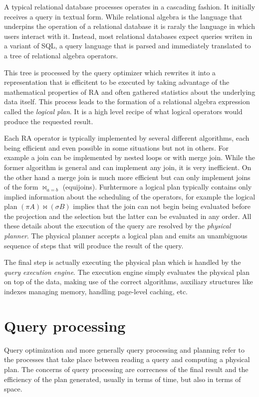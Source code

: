A typical relational database processes operates in a cascading
fashion. It initially receives a query in textual form. While
relational algebra is the language that underpins the operation of a
relational database it is raraly the language in which users interact
with it. Instead, most relational databases expect queries writen in a
variant of SQL, a query language that is parsed and immediately
translated to a tree of relational algebra operators.

This tree is processed by the query optimizer which rewrites it into a
representation that is efficitent to be executed by taking advantage
of the mathematical properties of RA and often gathered statistics
about the underlying data itself. This process leads to the formation
of a relational algebra expression called the \emph{logical plan}. It is a
high level recipe of what logical operators would produce the
requested result.


Each RA operator is typically implemented by several different
algorithms, each being efficient and even possible in some situations
but not in others. For example a join can be implemented by nested
loops or with merge join.  While the former algorithm is general and
can implement any join, it is very inefficient. On the other hand a
merge join is much more efficient but can only implement joins of the
form \(\Join_{a=b}\) (equijoins). Furhtermore a logical plan typically
contains only implied information about the scheduling of the
operators, for example the logical plan \((\pi A) \Join (\sigma B)\)
implies that the join can not begin being evaluated before the
projection and the selection but the latter can be evaluated in any
order. All these details about the execution of the query are resolved
by the \emph{physical planner}. The physical planner accepts a logical
plan and emits an unambiguous sequence of steps that will produce the
result of the query.

The final step is actually executing the physical plan which is
handled by the \emph{query execution engine}. The execution engine simply
evaluates the physical plan on top of the data, making use of the
correct algorithms, auxiliary structures like indexes managing memory,
handling page-level caching, etc.

\section{Query processing}
\label{sec:org1ddf14b}

Query optimization and more generally query processing and planning
refer to the processes that take place between reading a query and
computing a physical plan. The concerns of query processing are
correcness of the final result and the efficiency of the plan
generated, usually in terms of time, but also in terms of space.

